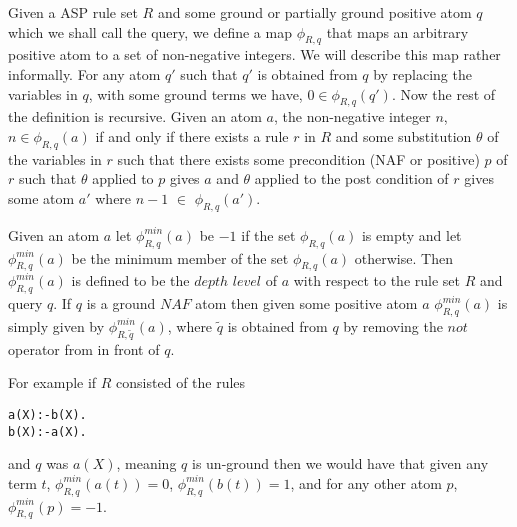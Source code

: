 \begin{definition}\label{depthlvl}
Given a ASP rule set $R$ and some ground or partially ground positive atom $q$ which we shall call the query, we define a map $\phi_{R,q}$ that maps an arbitrary positive atom to a set of non-negative integers. We
will describe this map rather informally. For any atom  $q'$ such that $q'$ is obtained from $q$ by replacing the variables in $q$, with some ground terms we have, $0\in
\phi_{R,q}(q')$. Now the rest of the definition is recursive. Given an atom $a$, the
non-negative integer $n$, $n\in \phi_{R,q}(a)$ if and only if there exists a rule
$r$ in $R$ and some substitution $\theta$ of the variables in $r$
such that there exists some precondition (NAF or positive) $p$ of $r$ such 
that $\theta$ applied to $p$ gives $a$ and $\theta$ applied to the post
condition of $r$ gives some atom $a'$ where $n-1$ $\in$ $\phi_{R,q}(a')$.

Given an atom $a$ let $\phi^{min}_{R,q}(a)$ be $-1$ if the set $\phi_{R,q}(a)$ is empty
and let $\phi^{min}_{R,q}(a)$ be the minimum member of the set $\phi_{R,q}(a)$
otherwise. Then $\phi^{min}_{R,q}(a)$ is defined to be the $depth$ $level$ of $a$
with respect to the rule set $R$ and query $q$. If $q$ is a ground $NAF$ atom then given some positive atom $a$ $\phi^{min}_{R,q}(a)$ is simply given by $\phi^{min}_{R,\tilde{q}}(a)$, where $\tilde{q}$ is obtained from $q$ by removing the $not$ operator from in front of $q$.  
\end{definition}
For example if $R$ consisted of the rules
\begin{lstlisting}[frame=none]
a(X):-b(X).
b(X):-a(X).
\end{lstlisting} and $q$ was $a(X)$, meaning $q$ is un-ground then we would have that given any term $t$, $\phi_{R,q}^{min}(a(t)) = 0$, $\phi_{R,q}^{min}(b(t)) = 1$, and for any other atom $p$, $\phi_{R,q}^{min}(p) = -1$.  


